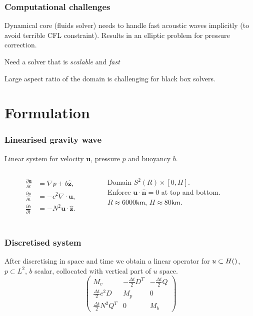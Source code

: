 \documentclass[presentation]{beamer}
\renewcommand{\vec}[1]{\ensuremath{\boldsymbol{#1}}}
\newcommand{\ddt}[1]{\frac{\partial #1}{\partial t}}
\newcommand{\zhat}{\hat{\vec{z}}}
\let\div\relax
\DeclareMathOperator{\div}{div}
\begin{document}
\begin{frame}
  \frametitle{Computational challenges}
  Dynamical core (fluids solver) needs to handle fast acoustic waves
  implicitly (to avoid terrible CFL constraint).  Results in an
  elliptic problem for pressure correction.

  Need a solver that is \emph{scalable} and \emph{fast}

  Large aspect ratio of the domain is challenging for black box solvers.
\end{frame}

\section{Formulation}

\begin{frame}
  \frametitle{Linearised gravity wave}
  Linear system for velocity $\vec{u}$, pressure $p$ and buoyancy $b$.
  \begin{columns}
    \begin{column}{0.4\textwidth}
      \begin{align*}
        \label{eq:1}
        \ddt{\vec{u}} &= \nabla p + b \zhat, \\
        \ddt{p} &= -c^2 \nabla\cdot \vec{u}, \\
        \ddt{b} &= -N^2\vec{u}\cdot\zhat.\\
      \end{align*}
    \end{column}
    \begin{column}{0.6\textwidth}
      Domain $S^2(R) \times [0, H]$.\\
      Enforce $\vec{u}\cdot \hat{\vec{n}} = 0$ at top and bottom.\\
      $R\approx 6000\textsf{km}$, $H\approx 80\textsf{km}$.
    \end{column}
  \end{columns}
\end{frame}

\begin{frame}
  \frametitle{Discretised system}
  After discretising in space and time we obtain a linear operator for
  $u \subset H(\div)$, $p \subset L^2$, $b$ scalar, collocated with
  vertical part of $u$ space.
\begin{equation*}
\begin{pmatrix}
  M_v & 
    -\frac{\Delta t}{2}D^T & 
    -\frac{\Delta t}{2}Q\\[1ex]
  \frac{\Delta t}{2}c^2D & M_p & 0\\[1ex]
  \frac{\Delta t}{2}N^2Q^T & 0 & M_b
\end{pmatrix}
\end{equation*}
\end{frame}
\end{document}
